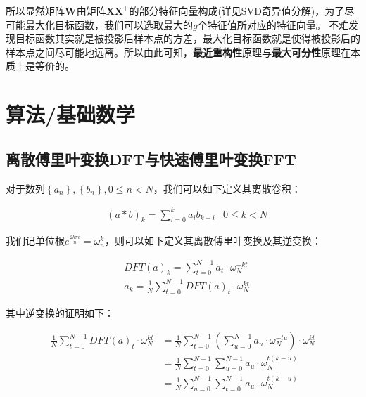 \documentclass[UTF8]{book}
\begin{document}
所以显然矩阵$\mathbf{W}$由矩阵$\mathbf{X}\mathbf{X}^\top$的部分特征向量构成(详见SVD奇异值分解)，为了尽可能最大化目标函数，我们可以选取最大的$g$个特征值所对应的特征向量。
不难发现目标函数其实就是被投影后样本点的方差，最大化目标函数就是使得被投影后的样本点之间尽可能地远离。所以由此可知，\textbf{最近重构性}原理与\textbf{最大可分性}原理在本质上是等价的。

\section{算法/基础数学}

\subsection{离散傅里叶变换DFT与快速傅里叶变换FFT}
对于数列$\left \{ a_n \right \}, \left \{ b_n \right \},0 \le n < N$，我们可以如下定义其离散卷积：
\begin{large}
    \begin{equation}
        \begin{aligned}
            &\left ( a*b \right )_k=\sum_{i=0}^{k}{a_ib_{k-i}} & 0 \le k < N
            \nonumber
        \end{aligned}
    \end{equation}
\end{large}
我们记单位根$e^{\frac{2k\pi i}{n}}=\omega_{n}^k$，则可以如下定义其离散傅里叶变换及其逆变换：
\begin{large}
    \begin{equation}
        \begin{aligned}
            &DFT(a)_k=\sum_{t=0}^{N-1}{a_t \cdot \omega_{N}^{-kt}} \\
            &a_k=\frac{1}{N}\sum_{t=0}^{N-1}{DFT(a)_t \cdot \omega_{N}^{kt}}
            \nonumber
        \end{aligned}
    \end{equation}
\end{large}
其中逆变换的证明如下：
\begin{large}
    \begin{equation}
        \begin{aligned}
            \frac{1}{N}\sum_{t=0}^{N-1}{DFT(a)_t \cdot \omega_{N}^{kt}} &= \frac{1}{N}\sum_{t=0}^{N-1}\left ( \sum_{u=0}^{N-1}a_u \cdot \omega_N^{-tu} \right ) \cdot \omega_{N}^{kt} \\
            &= \frac{1}{N}\sum_{t=0}^{N-1}\sum_{u=0}^{N-1}a_u \cdot \omega_N^{t(k-u)} \\
            &= \frac{1}{N}\sum_{u=0}^{N-1}\sum_{t=0}^{N-1}a_u \cdot \omega_N^{t(k-u)}
            \nonumber
        \end{aligned}
    \end{equation}
\end{large}
\end{document}
